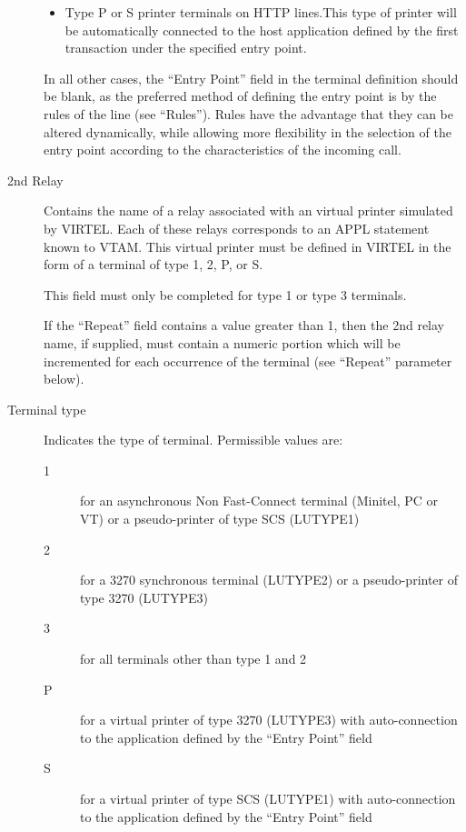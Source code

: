 \documentclass[letterpaper,10pt,english]{sphinxmanual}
\begin{document}
\begin{description}
\begin{itemize}
\item {} 
Type P or S printer terminals on HTTP lines.This type of printer will be automatically connected to the host application defined by the first transaction under the specified entry point.

\end{itemize}

In all other cases, the “Entry Point” field in the terminal definition should be blank, as the preferred method of defining the entry point is by the rules of the line (see “Rules”). Rules have the advantage that they can be
altered dynamically, while allowing more flexibility in the selection of the entry point according to the characteristics of the incoming call.

\item[{2nd Relay}] \leavevmode
Contains the name of a relay associated with an virtual printer simulated by VIRTEL. Each of these relays corresponds to an APPL statement known to VTAM. This virtual printer must be defined in VIRTEL in the form of a terminal of type
1, 2, P, or S.

This field must only be completed for type 1 or type 3 terminals.

If the “Repeat” field contains a value greater than 1, then the 2nd relay name, if supplied, must contain a numeric portion which will be incremented for each occurrence of the terminal (see “Repeat” parameter below).

\item[{Terminal type}] \leavevmode
Indicates the type of terminal. Permissible values are:
\begin{description}
\item[{1}] \leavevmode
for an asynchronous Non Fast-Connect terminal (Minitel, PC or VT) or a pseudo-printer of type SCS (LUTYPE1)

\item[{2}] \leavevmode
for a 3270 synchronous terminal (LUTYPE2) or a pseudo-printer of type 3270 (LUTYPE3)

\item[{3}] \leavevmode
for all terminals other than type 1 and 2

\item[{P}] \leavevmode
for a virtual printer of type 3270 (LUTYPE3) with auto-connection to the application defined by the “Entry Point” field

\item[{S}] \leavevmode
for a virtual printer of type SCS (LUTYPE1) with auto-connection to the application defined by the “Entry Point” field


\end{description}
\end{description}
\end{document}
